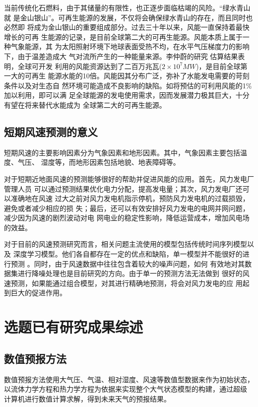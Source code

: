 \documentclass[AutoFakeBold]{LZUThesis}
\begin{document}
当前传统化石燃料，由于其储量的有限性，也正逐步面临枯竭的风险。“绿水青山就
是金山银山”。可再生能源的发展，不仅将会确保绿水青山的存在，而且同时也必然即
将成为金山银山的重要组成部分。过去三十年以来，风能一直保持着最快增长的可再
生能源的记录，是目前全球第二大的可再生能源。风能本质上属于一种气象能源，其
为太阳照射环境下地球表面受热不均，在水平气压梯度力的影响下，由于温差造成大
气对流所产生的一种能量来源。李仲蔚的研究
\cite{李仲蔚2019风力发电企业价值评估研究}估算结果表明，全球可开发
利用的风能资源达到了二百万兆瓦($2\times10^7MW$)，是目前全球第一大的可再生
能源水能的10倍。风能因其分布广泛，弥补了水能发电需要的苛刻条件以及对生态自
然环境可能造成不良影响的缺陷。如将预估的可利用风能的1\%加以利用，即可以满
足全球能源的发电使用需求，因而发展潜力极其巨大，十分有望在将来替代水能成为
全球第二大的可再生能源。

\subsection{短期风速预测的意义}
短期风速的主要影响因素分为气象因素和地形因素。其中，气象因素主要包括温度、气压、
湿度等，而地形因素包括地貌、地表障碍等。

对于短期近地面风速的预测能够很好的帮助并促进风能的应用。首先，风力发电厂管理人员
可以通过预测结果优化电力分配，提高发电量；其次，风力发电厂还可以准确地在风速
过大之前对风力发电机指示停机，预防风力发电机的过载损毁，避免或者减少相应的损
失；最后，还可以有效安排好风力发电的电网并网问题，减少因为风速的剧烈波动对电
网电业的稳定性影响，降低运营成本，增加风电场的效益。

对于目前的风速预测研究而言，相关问题主流使用的模型包括传统时间序列模型以及
深度学习模型。他们各自都存在一定的优点和缺陷，单一模型并不能很好的进行预测
\cite{陆冰鉴2020基于}。同时，由于风速数据中往往包含着较大的噪声问题，如何
有效地对其数据集进行降噪处理也是目前研究的方向。由于单一的预测方法无法做到
很好的风速预测，如果能通过组合模型，对其进行精确地预测，将会对风力发电的应
用起到巨大的促进作用。

\section{选题已有研究成果综述}
\subsection{数值预报方法}
数值预报方法使用大气压、气温、相对湿度、风速等数值型数据来作为初始状态，
以流体力学方程和热力学方程为依据来实现整个大气状态模型的构建，通过超级
计算机进行数值计算求解，得到未来天气的预报结果。
\cite{姜兆宇2019多时空尺度的风力发电预测方法综述}
\end{document}
